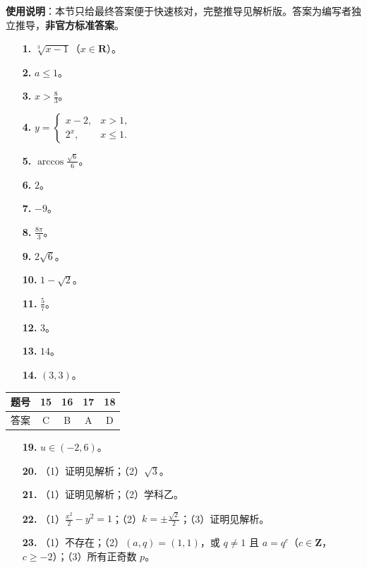 
\begin{gknotice}
\textbf{使用说明}：本节只给最终答案便于快速核对，完整推导见解析版。答案为编写者独立推导，\textbf{非官方标准答案}。
\end{gknotice}

\begin{itemize}[leftmargin=2.6em]
  \item[\textbf{1.}] $\sqrt[3]{x-1}$（$x\in\mathbf R$）。
  \item[\textbf{2.}] $a\leqslant1$。
  \item[\textbf{3.}] $x>\frac83$。
  \item[\textbf{4.}] $y=\begin{cases}x-2,&x>1,\\2^x,&x\leqslant1.\end{cases}$
  \item[\textbf{5.}] $\arccos\frac{\sqrt6}{6}$。
  \item[\textbf{6.}] $2$。
  \item[\textbf{7.}] $-9$。
  \item[\textbf{8.}] $\frac{8\pi}{3}$。
  \item[\textbf{9.}] $2\sqrt6$。
  \item[\textbf{10.}] $1-\sqrt2$。
  \item[\textbf{11.}] $\frac57$。
  \item[\textbf{12.}] $3$。
  \item[\textbf{13.}] $14$。
  \item[\textbf{14.}] $(3,3)$。
\end{itemize}

\begin{center}\begin{tabular}{ccccc}
\toprule
题号 & 15 & 16 & 17 & 18 \\
\midrule
答案 & C & B & A & D \\
\bottomrule
\end{tabular}\end{center}

\begin{itemize}[leftmargin=2.6em]
  \item[\textbf{19.}] $u\in(-2,6)$。
  \item[\textbf{20.}] （1）证明见解析；（2）$\sqrt3$。
  \item[\textbf{21.}] （1）证明见解析；（2）学科乙。
  \item[\textbf{22.}] （1）$\frac{x^2}{2}-y^2=1$；（2）$k=\pm\frac{\sqrt2}{2}$；（3）证明见解析。
  \item[\textbf{23.}] （1）不存在；（2）$(a,q)=(1,1)$，或 $q\neq1$ 且 $a=q^c$（$c\in\mathbf Z$，$c\geqslant-2$）；（3）所有正奇数 $p$。
\end{itemize}
